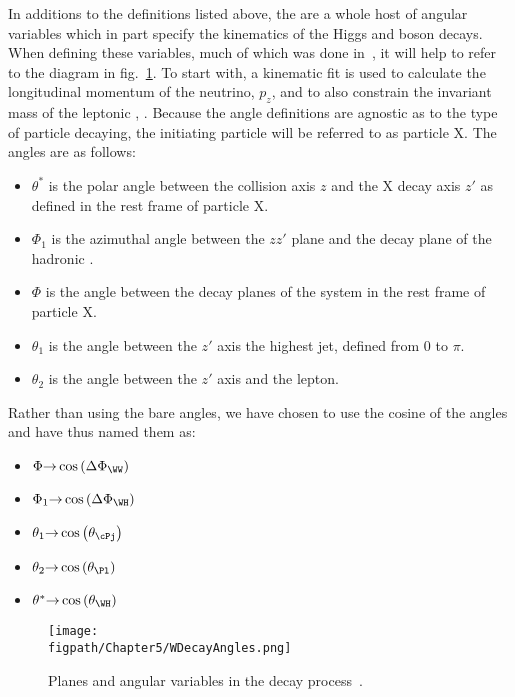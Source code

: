 In additions to the definitions listed above, the are a whole host of angular variables which in part specify the kinematics of the Higgs and \W boson decays.
When defining these variables, much of which was done in~\cite{Dobrescu2010}, it will help to refer to the diagram in fig.~\ref{fig:XWWDecayAngles}.
To start with, a kinematic fit is used to calculate the longitudinal momentum of the neutrino, $p_{z}$, and to also constrain the invariant mass of the leptonic \W, \Mlv.
Because the angle definitions are agnostic as to the type of particle decaying, the initiating particle will be referred to as particle X.
The angles are as follows:
\begin{itemize}
  \item $\theta^{*}$ is the polar angle between the collision axis $z$ and the X decay axis $z'$ as defined in the rest frame of particle X.
  \item $\Phi_{1}$ is the azimuthal angle between the $zz'$ plane and the decay plane of the hadronic \W.
  \item $\Phi$ is the angle between the decay planes of the \WW system in the rest frame of particle X.
  \item $\theta_{1}$ is the angle between the $z'$ axis the highest \pt jet, defined from 0 to $\pi$.
  \item $\theta_{2}$ is the angle between the $z'$ axis and the lepton.
\end{itemize}
Rather than using the bare angles, we have chosen to use the cosine of the angles and have thus named them as:
\begin{itemize}
  \item $\Phi{\rightarrow}\cos\left(\Delta\Phi_{\WW}\right)$
  \item $\Phi_{1}{\rightarrow}\cos\left(\Delta\Phi_{\WH}\right)$
  \item $\theta_{1}{\rightarrow}\cos\left(\theta_{\cPj}\right)$
  \item $\theta_{2}{\rightarrow}\cos\left(\theta_{\Pl}\right)$
  \item $\theta^{*}{\rightarrow}\cos\left(\theta_{\WH}\right)$
\end{itemize}

\begin{figure}[!hbt]
    \centering
    \texttt{[image: \\figpath/Chapter5/WDecayAngles.png]}
    \caption{Planes and angular variables in the \HWWlvqq decay process~\cite{PhysRevD.81.075022}.}
    \label{fig:XWWDecayAngles}
\end{figure}

